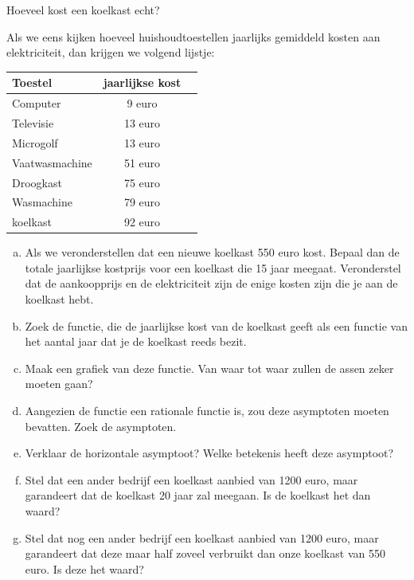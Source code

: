 \documentclass[12pt]{article}
\begin{document}
\begin{oefening}
Hoeveel kost een koelkast echt?

Als we eens kijken hoeveel huishoudtoestellen jaarlijks gemiddeld kosten aan elektriciteit, dan krijgen we volgend lijstje:
\begin{center}
  \begin{tabular}{l|cl}
  Toestel & jaarlijkse kost\\
  \hline
  Computer & 9 euro\\
  Televisie & 13 euro\\
  Microgolf & 13 euro\\
  Vaatwasmachine & 51 euro\\
  Droogkast & 75 euro\\
  Wasmachine & 79 euro\\
  koelkast & 92 euro\\
  \end{tabular}
\end{center}

\begin{enumerate}[(a)]
  \item Als we veronderstellen dat een nieuwe koelkast 550 euro kost. Bepaal dan de totale jaarlijkse kostprijs voor een koelkast die 15 jaar meegaat. Veronderstel dat de aankoopprijs en de elektriciteit zijn de enige kosten zijn die je aan de koelkast hebt.
  \item Zoek de functie, die de jaarlijkse kost van de koelkast geeft als een functie van het aantal jaar dat je de koelkast reeds bezit.
  \item Maak een grafiek van deze functie. Van waar tot waar zullen de assen zeker moeten gaan?
  \item Aangezien de functie een rationale functie is, zou deze asymptoten moeten bevatten. Zoek de asymptoten.
  \item Verklaar de horizontale asymptoot? Welke betekenis heeft deze asymptoot?
  \item Stel dat een ander bedrijf een koelkast aanbied van 1200 euro, maar garandeert dat de koelkast 20 jaar zal meegaan. Is de koelkast het dan waard?
  \item Stel dat nog een ander bedrijf een koelkast aanbied van 1200 euro, maar garandeert dat deze maar half zoveel verbruikt dan onze koelkast van 550 euro. Is deze het waard?
\end{enumerate}
\end{oefening}
\end{document}
